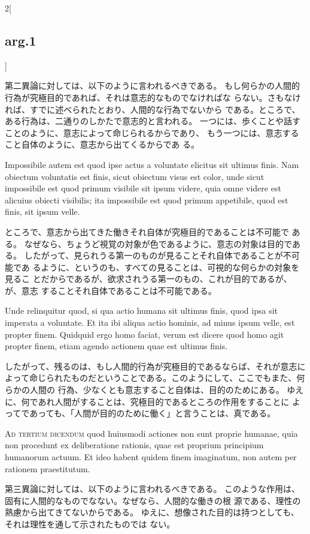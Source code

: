 \documentclass[paper=a4paper,fontsize=10pt,jafontsize=9pt,titlepage]{jlreq}
\begin{document}
\begin{paracol}{2}[\subsection{arg.1}]
\switchcolumn

第二異論に対しては、以下のように言われるべきである。
もし何らかの人間的行為が究極目的であれば、それは意志的なものでなければな
 らない。さもなければ、すでに述べられたとおり、人間的な行為でないから
 である。ところで、ある行為は、二通りのしかたで意志的と言われる。
一つには、歩くことや話すことのように、意志によって命じられるからであり、
 もう一つには、意志すること自体のように、意志から出てくるからであ
 る。

\switchcolumn*

Impossibile autem
est quod ipse actus a voluntate elicitus sit ultimus finis. Nam obiectum
voluntatis est finis, sicut obiectum visus est color, unde sicut
impossibile est quod primum visibile sit ipsum videre, quia omne videre
est alicuius obiecti visibilis; ita impossibile est quod primum
appetibile, quod est finis, sit ipsum velle.

\switchcolumn

ところで、意志から出てきた働きそれ自体が究極目的であることは不可能で
 ある。
なぜなら、ちょうど視覚の対象が色であるように、意志の対象は目的である。
したがって、見られうる第一のものが見ることそれ自体であることが不可能であ
 るように、というのも、すべての見ることは、可視的な何らかの対象を見るこ
 とだからであるが、欲求されうる第一のもの、これが目的であるが、が、意志
 することそれ自体であることは不可能である。

\switchcolumn*

Unde relinquitur quod, si
qua actio humana sit ultimus finis, quod ipsa sit imperata a
voluntate. Et ita ibi aliqua actio hominis, ad minus ipsum velle, est
propter finem. Quidquid ergo homo faciat, verum est dicere quod homo
agit propter finem, etiam agendo actionem quae est ultimus finis.

\switchcolumn

したがって、残るのは、もし人間的行為が究極目的であるならば、それが意志に
 よって命じられたものだということである。このようにして、ここでもまた、何らかの人間の
 行為、少なくとも意志すること自体は、目的のためにある。
ゆえに、何であれ人間がすることは、究極目的であるところの作用をすることに
 よってであっても、「人間が目的のために働く」と言うことは、真である。

\switchcolumn*[\subsection{ad.3}]

{\scshape Ad tertium dicendum} quod huiusmodi
actiones non sunt proprie humanae, quia non procedunt ex deliberatione
rationis, quae est proprium principium humanorum actuum. Et ideo habent
quidem finem imaginatum, non autem per rationem praestitutum.

\switchcolumn

第三異論に対しては、以下のように言われるべきである。
このような作用は、固有に人間的なものでなない。なぜなら、人間的な働きの根
 源である、理性の熟慮から出てきてないからである。
ゆえに、想像された目的は持つとしても、それは理性を通して示されたものでは
 ない。

\end{paracol}
\end{document}
